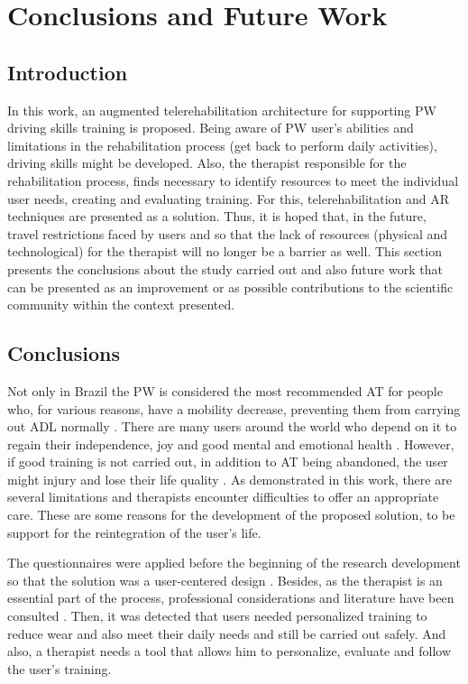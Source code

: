 \chapter{Conclusions and Future Work}


\section{Introduction} 

In this work, an augmented telerehabilitation architecture for supporting PW driving skills training is proposed. Being aware of PW user's abilities and limitations in the rehabilitation process (get back to perform daily activities), driving skills might be developed. Also, the therapist responsible for the rehabilitation process,  finds necessary to identify resources to meet the individual user needs, creating and evaluating training. For this, telerehabilitation and AR techniques are presented as a solution. Thus, it is hoped that, in the future, travel restrictions faced by users and so that the lack of resources (physical and technological) for the therapist will no longer be a barrier as well.  This section presents the conclusions about the study carried out and also future work that can be presented as an improvement or as possible contributions to the scientific community within the context presented. 

\section{Conclusions} 

Not only in Brazil the PW is considered the most recommended AT for people who, for various reasons, have a mobility decrease, preventing them from carrying out ADL normally \cite{censo2010, john2018, caro2018}. There are many users around the world who depend on it to regain their independence, joy and good mental and emotional health \cite{john2018, caro2018, macgillivray2018, censo2010}. However, if good training is not carried out, in addition to AT being abandoned, the user might injury and lose their life quality \cite{who2008, caro2018, macgillivray2018,dorrington2016, pettersson2014}. As demonstrated in this work, there are several limitations and therapists encounter difficulties to offer an appropriate care. These are some reasons for the development of the proposed solution, to be support for the reintegration of the user's life.

The questionnaires were applied before the beginning of the research development so that the solution was a user-centered design \cite{dorrington2016}. Besides, as the therapist is an essential part of the process, professional considerations and literature have been consulted \cite{valentini2019}. Then, it was detected that users needed personalized training to reduce wear and also meet their daily needs and still be carried out safely. And also, a therapist needs a tool that allows him to personalize, evaluate and follow the user's training.

